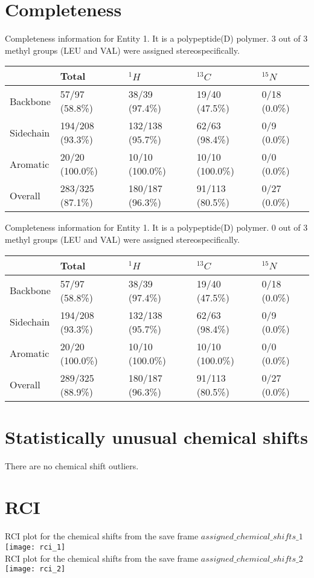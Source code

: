 \section{Completeness}
Completeness information for Entity 1. It is a polypeptide(D) polymer. 3 out of 3 methyl groups (LEU and VAL) were assigned stereospecifically.\begin{longtable}{|l|l|l|l|l|}
\hline
  & Total & $^{1}H$ & $^{13}C$ & $^{15}N$\\\hline
Backbone & 57/97 (58.8\%)& 38/39 (97.4\%)& 19/40 (47.5\%)& 0/18 (0.0\%) \\
\hline
Sidechain & 194/208 (93.3\%)& 132/138 (95.7\%)& 62/63 (98.4\%)& 0/9 (0.0\%) \\
\hline
Aromatic & 20/20 (100.0\%)& 10/10 (100.0\%)& 10/10 (100.0\%)& 0/0 (0.0\%) \\
\hline
Overall & 283/325 (87.1\%)& 180/187 (96.3\%)& 91/113 (80.5\%)& 0/27 (0.0\%) \\
\hline
\end{longtable}
Completeness information for Entity 1. It is a polypeptide(D) polymer. 0 out of 3 methyl groups (LEU and VAL) were assigned stereospecifically.\begin{longtable}{|l|l|l|l|l|}
\hline
  & Total & $^{1}H$ & $^{13}C$ & $^{15}N$\\\hline
Backbone & 57/97 (58.8\%)& 38/39 (97.4\%)& 19/40 (47.5\%)& 0/18 (0.0\%) \\
\hline
Sidechain & 194/208 (93.3\%)& 132/138 (95.7\%)& 62/63 (98.4\%)& 0/9 (0.0\%) \\
\hline
Aromatic & 20/20 (100.0\%)& 10/10 (100.0\%)& 10/10 (100.0\%)& 0/0 (0.0\%) \\
\hline
Overall & 289/325 (88.9\%)& 180/187 (96.3\%)& 91/113 (80.5\%)& 0/27 (0.0\%) \\
\hline
\end{longtable}

\section{Statistically unusual chemical shifts}
There are no chemical shift outliers.\
\section{RCI}
RCI plot for the chemical shifts from the  save frame $assigned\_chemical\_shifts\_1$\\ \texttt{[image: rci\_1]}\\
RCI plot for the chemical shifts from the  save frame $assigned\_chemical\_shifts\_2$\\ \texttt{[image: rci\_2]}\\

